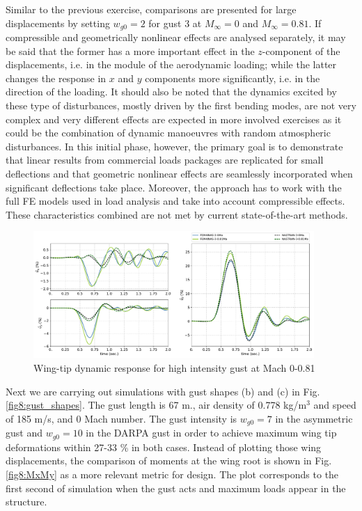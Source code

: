 \documentclass[11pt]{article}
\begin{document}
Similar to the previous exercise, comparisons are presented for large displacements  by setting $w_{g0} = 2$ for gust 3 at $M_\infty = 0$ and $M_\infty = 0.81$. If compressible and geometrically nonlinear effects are analysed separately, it may be said that the former has a more important effect in the $z$-component of the displacements, i.e. in the module of the aerodynamic loading; while the latter changes the response in $x$ and $y$ components more significantly, i.e. in the direction of the loading. It should also be noted that the dynamics excited by these type of disturbances, mostly driven by the first bending modes, are not very complex and very different effects are expected in more involved exercises as it could be the combination of dynamic manoeuvres with random atmospheric disturbances.  In this initial phase, however, the primary goal is to demonstrate that linear results from commercial loads packages are replicated for small deflections and that geometric nonlinear effects are seamlessly incorporated when significant deflections take place. Moreover, the approach has to work with the full FE models used in load analysis and take into account compressible effects. These characteristics combined are not met by current state-of-the-art methods.

\begin{figure}[h!]
\centering
\includegraphics[width=0.95\textwidth]{./img/gust131_2-081Ma.pdf}
\caption{Wing-tip dynamic response for high intensity gust at Mach 0-0.81}\label{fig:gust131_2-081Ma}
\end{figure}
\newpage
Next we are carrying out simulations with gust shapes (b) and (c) in Fig. \ref{fig8:gust_shapes}. The gust length is 67 m.,  air density of 0.778 kg/m$^3$ and speed of 185 m/s, and 0 Mach number. The gust intensity is  $w_{g0} = 7$ in the asymmetric gust and  $w_{g0} = 10$ in the DARPA gust in order to achieve maximum wing tip deformations within 27-33 \% in both cases. Instead of plotting those wing displacements, the comparison of moments at the wing root is shown in Fig. \ref{fig8:MxMy} as a more relevant metric for design. The plot  corresponds to the first second of simulation when the gust acts and maximum loads appear in the structure. 
\end{document}
